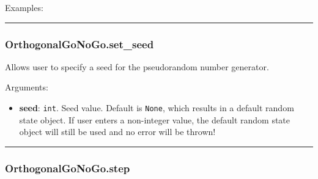 Examples:

\begin{Shaded}
\begin{Highlighting}[]
\OperatorTok{=}
\end{Highlighting}
\end{Shaded}

\begin{center}\rule{0.5\linewidth}{\linethickness}\end{center}

\subsubsection{OrthogonalGoNoGo.set\_seed}\label{orthogonalgonogo.set_seed}

\begin{Shaded}
\begin{Highlighting}[]
\OperatorTok{=}\NormalTok{)}
\end{Highlighting}
\end{Shaded}

Allows user to specify a seed for the pseudorandom number generator.

Arguments:

\begin{itemize}
\tightlist
\item
  \textbf{seed}: \texttt{int}. Seed value. Default is \texttt{None},
  which results in a default random state object. If user enters a
  non-integer value, the default random state object will still be used
  and no error will be thrown!
\end{itemize}

\begin{center}\rule{0.5\linewidth}{\linethickness}\end{center}

\subsubsection{OrthogonalGoNoGo.step}\label{orthogonalgonogo.step}

\begin{Shaded}
\begin{Highlighting}[]
\end{Highlighting}
\end{Shaded}

